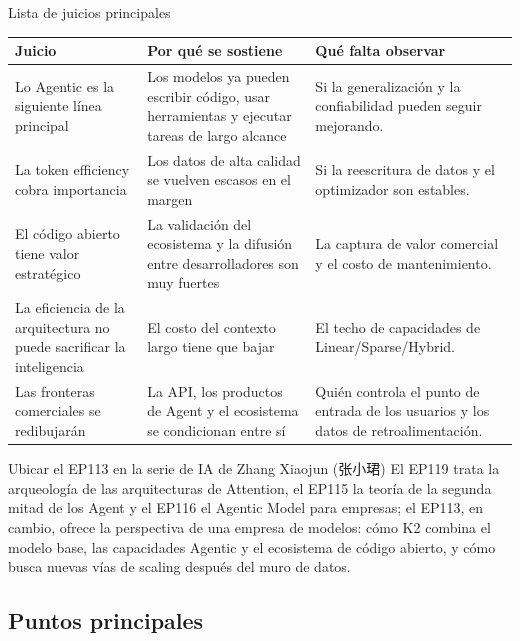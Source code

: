 \documentclass[a4paper]{article}
\begin{document}
\begin{knowledgebox}{Lista de juicios principales}
\begin{tabularx}{\textwidth}{p{}p{}X}
\toprule
Juicio & Por qué se sostiene & Qué falta observar \\
\midrule
Lo Agentic es la siguiente línea principal & Los modelos ya pueden escribir código, usar herramientas y ejecutar tareas de largo alcance & Si la generalización y la confiabilidad pueden seguir mejorando. \\
La token efficiency cobra importancia & Los datos de alta calidad se vuelven escasos en el margen & Si la reescritura de datos y el optimizador son estables. \\
El código abierto tiene valor estratégico & La validación del ecosistema y la difusión entre desarrolladores son muy fuertes & La captura de valor comercial y el costo de mantenimiento. \\
La eficiencia de la arquitectura no puede sacrificar la inteligencia & El costo del contexto largo tiene que bajar & El techo de capacidades de Linear/Sparse/Hybrid. \\
Las fronteras comerciales se redibujarán & La API, los productos de Agent y el ecosistema se condicionan entre sí & Quién controla el punto de entrada de los usuarios y los datos de retroalimentación. \\
\bottomrule
\end{tabularx}
\end{knowledgebox}

\begin{importantbox}{Ubicar el EP113 en la serie de IA de Zhang Xiaojun (张小珺)}
El EP119 trata la arqueología de las arquitecturas de Attention, el EP115 la teoría de la segunda mitad de los Agent y el EP116 el Agentic Model para empresas; el EP113, en cambio, ofrece la perspectiva de una empresa de modelos: cómo K2 combina el modelo base, las capacidades Agentic y el ecosistema de código abierto, y cómo busca nuevas vías de scaling después del muro de datos.
\end{importantbox}

\subsection{Puntos principales}
\end{document}
